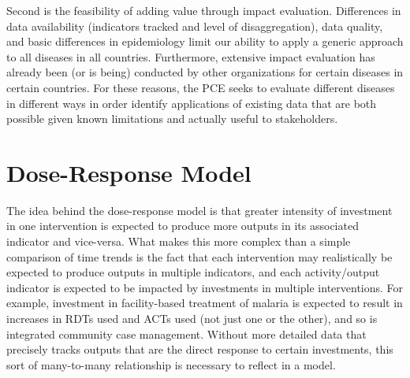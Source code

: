 \documentclass[twocolumn]{bmcart}%
\begin{document}
Second is the feasibility of adding value through impact evaluation. Differences in data availability (indicators tracked and level of disaggregation), data quality, and basic differences in epidemiology limit our ability to apply a generic approach to all diseases in all countries. Furthermore, extensive impact evaluation has already been (or is being) conducted by other organizations for certain diseases in certain countries. For these reasons, the PCE seeks to evaluate different diseases in different ways in order identify applications of existing data that are both possible given known limitations and actually useful to stakeholders. \\

\section{Dose-Response Model}

The idea behind the dose-response model is that greater intensity of investment in one intervention is expected to produce more outputs in its associated indicator and vice-versa. What makes this more complex than a simple comparison of time trends is the fact that each intervention may realistically be expected to produce outputs in multiple indicators, and each activity/output indicator is expected to be impacted by investments in multiple interventions. For example, investment in facility-based treatment of malaria is expected to result in increases in RDTs used and ACTs used (not just one or the other), and so is integrated community case management. Without more detailed data that precisely tracks outputs that are the direct response to certain investments, this sort of many-to-many relationship is necessary to reflect in a model. \\
\end{document}
